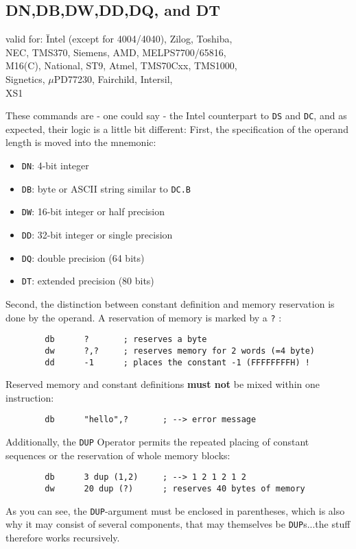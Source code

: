 \documentclass[12pt,twoside]{report}
\makeatletter
\newcommand{\bb}[1]{{\bf #1}}
\newcommand{\tty}[1]{{\tt #1}}
\newcommand{\ttindex}[1]{\index{#1@{\tt #1}}}
\makeatother
\begin{document}

\subsection{DN,DB,DW,DD,DQ, and DT}
\ttindex{DN}\ttindex{DB}\ttindex{DW}\ttindex{DD}\ttindex{DQ}\ttindex{DT}

{\em\begin{tabbing}
valid for: \= Intel (except for 4004/4040), Zilog, Toshiba,\\
           \> NEC, TMS370, Siemens, AMD, MELPS7700/65816,\\
           \> M16(C), National, ST9, Atmel, TMS70Cxx, TMS1000,\\
           \> Signetics, $\mu$PD77230, Fairchild, Intersil,\\
           \> XS1
\end{tabbing}}

These commands are - one could say - the Intel counterpart to \tty{DS} and
\tty{DC}, and as expected, their logic is a little bit different: First,
the specification of the operand length is moved into the mnemonic:
\begin{itemize}
\item{\tty{DN}: 4-bit integer}
\item{\tty{DB}: byte or ASCII string similar to \tty{DC.B}}
\item{\tty{DW}: 16-bit integer or half precision}
\item{\tty{DD}: 32-bit integer or single precision}
\item{\tty{DQ}: double precision   (64 bits)}
\item{\tty{DT}: extended precision (80 bits)}
\end{itemize}
Second, the distinction between constant definition and memory
reservation is done by the operand.  A reservation of memory is
marked by a \tty{?} :
\begin{verbatim}
        db      ?       ; reserves a byte
        dw      ?,?     ; reserves memory for 2 words (=4 byte)
        dd      -1      ; places the constant -1 (FFFFFFFFH) !
\end{verbatim}
Reserved memory and constant definitions \bb{must not} be mixed within one
instruction:
\begin{verbatim}
        db      "hello",?       ; --> error message
\end{verbatim}
Additionally, the \tty{DUP} Operator permits the repeated placing of
constant sequences or the reservation of whole memory blocks:
\begin{verbatim}
        db      3 dup (1,2)     ; --> 1 2 1 2 1 2
        dw      20 dup (?)      ; reserves 40 bytes of memory
\end{verbatim}
As you can see, the \tty{DUP}-argument must be enclosed in parentheses,
which is also why it may consist of several components, that may
themselves be \tty{DUP}s...the stuff therefore works recursively.
\end{document}

